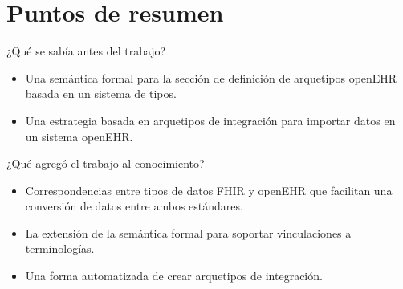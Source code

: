 \section*{Puntos de resumen}

¿Qué se sabía antes del trabajo?

\begin{itemize}
  \item Una semántica formal para la sección de definición de arquetipos openEHR basada en un sistema de tipos.
  \item Una estrategia basada en arquetipos de integración para importar datos en un sistema openEHR.
\end{itemize}

¿Qué agregó el trabajo al conocimiento?

\begin{itemize}
  \item Correspondencias entre tipos de datos FHIR y openEHR que facilitan una conversión de datos entre ambos estándares.
  \item La extensión de la semántica formal para soportar vinculaciones a terminologías.
  \item Una forma automatizada de crear arquetipos de integración.
\end{itemize}
